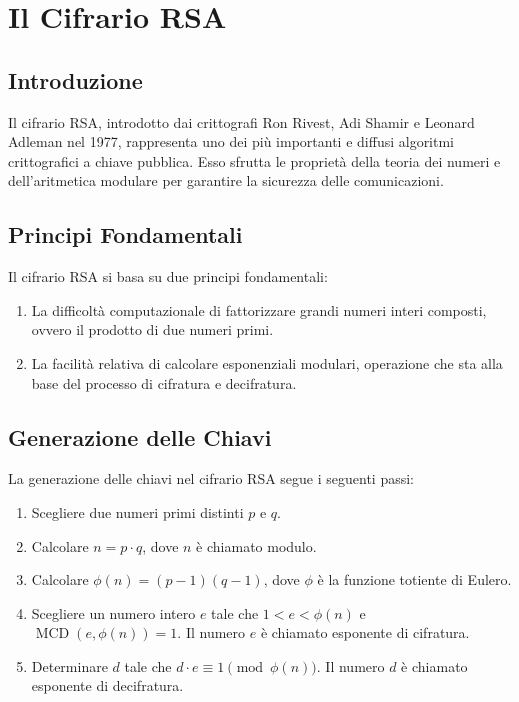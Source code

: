 \documentclass[a4paper,12pt]{report}
\begin{document}
\chapter{Il Cifrario RSA}

\section{Introduzione}
Il cifrario RSA, introdotto dai crittografi Ron Rivest, Adi Shamir e Leonard Adleman nel 1977, rappresenta uno dei più importanti e diffusi algoritmi crittografici a chiave pubblica. Esso sfrutta le proprietà della teoria dei numeri e dell'aritmetica modulare per garantire la sicurezza delle comunicazioni.

\section{Principi Fondamentali}
Il cifrario RSA si basa su due principi fondamentali:

\begin{enumerate}
    \item La difficoltà computazionale di fattorizzare grandi numeri interi composti, ovvero il prodotto di due numeri primi.
    \item La facilità relativa di calcolare esponenziali modulari, operazione che sta alla base del processo di cifratura e decifratura.
\end{enumerate}

\section{Generazione delle Chiavi}
La generazione delle chiavi nel cifrario RSA segue i seguenti passi:

\begin{enumerate}
    \item Scegliere due numeri primi distinti $p$ e $q$.
    \item Calcolare $n = p \cdot q$, dove $n$ è chiamato modulo.
    \item Calcolare $\phi(n) = (p - 1)(q - 1)$, dove $\phi$ è la funzione totiente di Eulero.
    \item Scegliere un numero intero $e$ tale che $1 < e < \phi(n)$ e $\operatorname{MCD}(e, \phi(n)) = 1$. Il numero $e$ è chiamato esponente di cifratura.
    \item Determinare $d$ tale che $d \cdot e \equiv 1 \pmod{\phi(n)}$. Il numero $d$ è chiamato esponente di decifratura.
\end{enumerate}
\end{document}

